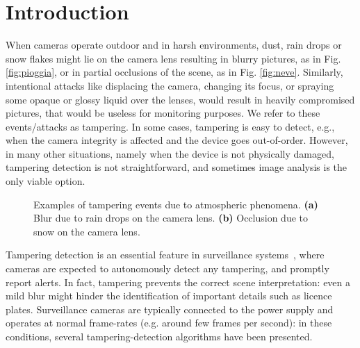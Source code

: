 \documentclass{llncs}
\begin{document}
\section{Introduction}\label{sec:introduction}
When cameras operate outdoor and in harsh environments, dust, rain drops or snow flakes might lie on the camera lens resulting in blurry pictures, as in Fig. \ref{fig:pioggia}, or in partial occlusions of the scene, as in Fig. \ref{fig:neve}. Similarly, intentional attacks like displacing the camera, changing its focus, or spraying some opaque or glossy liquid over the lenses, would result in heavily compromised pictures, that would be useless for monitoring purposes. We refer to these events/attacks as tampering. In some cases, tampering is easy to detect, e.g., when the camera integrity is affected and the device goes out-of-order. However, in many other situations, namely when the device is not physically damaged, tampering detection is not straightforward, and sometimes image analysis is the only viable option. 

\begin{figure}[t!]
\centering
{}
\caption[Tampering examples]{Examples of tampering events due to atmospheric phenomena. \textbf{(a)} Blur due to rain drops on the camera lens. \textbf{(b)} Occlusion due to snow on the camera lens.}
\label{fig:tampering}
\end{figure}

Tampering detection is an essential feature in surveillance systems~\cite{hampapur2005smart}, where cameras are expected to autonomously detect any tampering, and promptly report alerts. In fact, tampering prevents the correct scene interpretation: even a mild blur might hinder the identification of important details such as licence plates. Surveillance cameras are typically connected to the power supply and operates at normal frame-rates (e.g. around few frames per second): in these conditions, several tampering-detection algorithms have been presented. 
\end{document}
